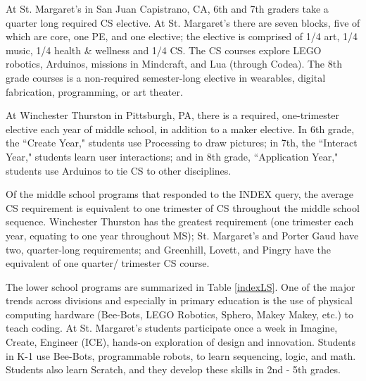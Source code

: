 At St. Margaret's in San Juan Capistrano, CA, 6th and 7th graders take a quarter long required CS elective. At St. Margaret's there are seven blocks, five of which are core, one PE, and one elective; the  elective is comprised of 1/4 art, 1/4 music, 1/4 health \& wellness and 1/4 CS. The CS courses explore LEGO robotics, Arduinos, missions in Mindcraft, and Lua (through Codea). The 8th grade courses is a non-required semester-long elective in wearables, digital fabrication, programming, or art theater.\par
At Winchester Thurston in Pittsburgh, PA, there is a required, one-trimester elective each year of middle school, in addition to a maker elective. In 6th grade, the ``Create Year," students use Processing to draw pictures; in 7th, the ``Interact Year," students learn user interactions; and in 8th grade, ``Application Year," students use Arduinos to tie CS to other disciplines. \par
Of the middle school programs that responded to the INDEX query, the average CS requirement is equivalent to one trimester of CS throughout the middle school sequence. Winchester Thurston has the greatest requirement (one trimester each year, equating to one year throughout MS); St. Margaret's and Porter Gaud have two, quarter-long requirements; and Greenhill, Lovett, and Pingry have the equivalent of one quarter/ trimester CS course. \par
The lower school programs are summarized in Table \ref{indexLS}. One of the major trends across divisions and especially in primary education is the use of physical computing hardware (Bee-Bots, LEGO Robotics, Sphero, Makey Makey, etc.) to teach coding. At St. Margaret's students participate once a week in Imagine, Create, Engineer (ICE), hands-on exploration of design and innovation. Students in K-1 use Bee-Bots, programmable robots, to learn sequencing, logic, and math. Students also learn Scratch, and they develop these skills in 2nd - 5th grades. \par

